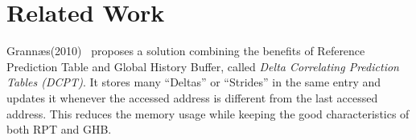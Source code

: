 \section{Related Work} %

Grannæs(2010)~\cite{grannaes2010} proposes a solution combining the benefits of
Reference Prediction Table and Global History Buffer, called \textit{Delta
Correlating Prediction Tables (DCPT)}. It stores many ``Deltas'' or ``Strides''
in the same entry and updates it whenever the accessed address is different from
the last accessed address. This reduces the memory usage while keeping the good
characteristics of both RPT and GHB.

